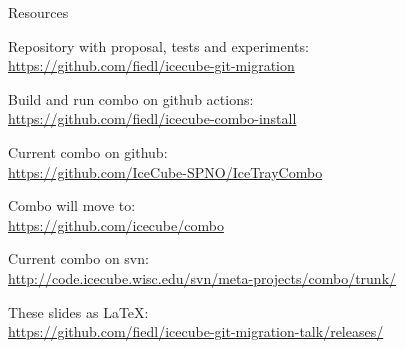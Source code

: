 
\begin{frame}{Resources}
  \begin{center}

    Repository with proposal, tests and experiments: \\
    \url{https://github.com/fiedl/icecube-git-migration}

    \vspace{1em}

    Build and run combo on github actions: \\
    \url{https://github.com/fiedl/icecube-combo-install}

    \vspace{1em}

    Current combo on github: \\
    \url{https://github.com/IceCube-SPNO/IceTrayCombo}

    \vspace{1em}

    Combo will move to: \\
    \url{https://github.com/icecube/combo}

    \vspace{1em}

    Current combo on svn: \\
    \url{http://code.icecube.wisc.edu/svn/meta-projects/combo/trunk/}

    \vspace{1em}

    These slides as \LaTeX: \\
    \url{https://github.com/fiedl/icecube-git-migration-talk/releases/}

  \end{center}
\end{frame}